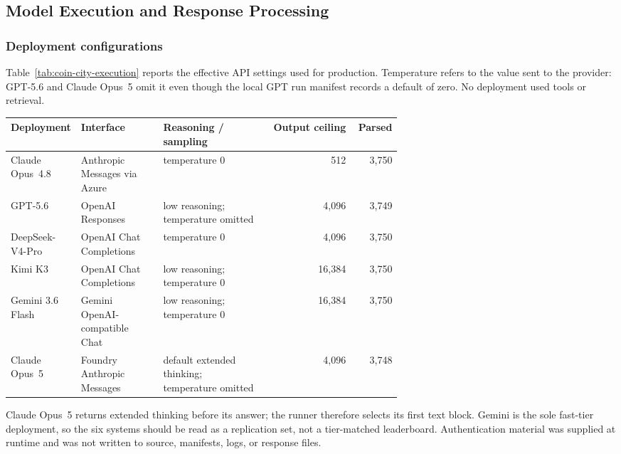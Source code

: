 \subsection{Model Execution and Response Processing}
\label{app:coin-city-execution}

\subsubsection{Deployment configurations}
Table~\ref{tab:coin-city-execution} reports the effective API settings used for
production. Temperature refers to the value sent to the provider: GPT-5.6 and
Claude Opus~5 omit it even though the local GPT run manifest records a default of
zero. No deployment used tools or retrieval.

\begin{center}
\begin{minipage}{\linewidth}
\centering
{}
\label{tab:coin-city-execution}
\scriptsize
\setlength{\tabcolsep}{3.5pt}
\begin{tabular}{p{0.16\linewidth} p{0.21\linewidth} p{0.27\linewidth} r r}
\toprule
Deployment & Interface & Reasoning / sampling & Output ceiling & Parsed \\
\midrule
Claude Opus~4.8 & Anthropic Messages via Azure & temperature 0 & 512 & 3,750 \\
GPT-5.6 & OpenAI Responses & low reasoning; temperature omitted & 4,096 & 3,749 \\
DeepSeek-V4-Pro & OpenAI Chat Completions & temperature 0 & 4,096 & 3,750 \\
Kimi K3 & OpenAI Chat Completions & low reasoning; temperature 0 & 16,384 & 3,750 \\
Gemini 3.6 Flash & Gemini OpenAI-compatible Chat & low reasoning; temperature 0 & 16,384 & 3,750 \\
Claude Opus~5 & Foundry Anthropic Messages & default extended thinking; temperature omitted & 4,096 & 3,748 \\
\bottomrule
\end{tabular}
\end{minipage}
\end{center}

Claude Opus~5 returns extended thinking before its answer; the runner therefore
selects its first text block. Gemini is the sole fast-tier deployment, so the six
systems should be read as a replication set, not a tier-matched leaderboard.
Authentication material was supplied at runtime and was not written to source,
manifests, logs, or response files.

